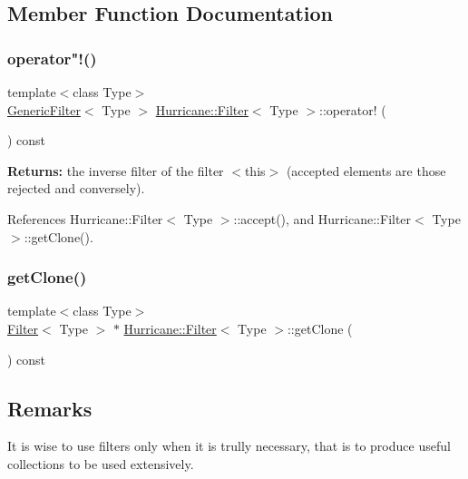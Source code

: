 \subsection{Member Function Documentation}
\mbox{\label{classHurricane_1_1Filter_a90c1a8c4caf6c6018ff50f5b9754e061}} 
\subsubsection{\texorpdfstring{operator"!()}{operator!()}}
{\footnotesize\ttfamily template$<$class Type$>$ \\
\hyperlink{classHurricane_1_1GenericFilter}{Generic\+Filter}$<$ Type $>$ \hyperlink{classHurricane_1_1Filter}{Hurricane\+::\+Filter}$<$ Type $>$\+::operator! (\begin{DoxyParamCaption}{ }\end{DoxyParamCaption}) const\hspace{0.3cm}{\ttfamily [inline]}}

{\bfseries Returns\+:} the inverse filter of the filter {\ttfamily $<$this$>$} (accepted elements are those rejected and conversely). 

References Hurricane\+::\+Filter$<$ Type $>$\+::accept(), and Hurricane\+::\+Filter$<$ Type $>$\+::get\+Clone().

\mbox{\label{classHurricane_1_1Filter_a596cad421801115efbc5c541f8d29e0b}} 
\subsubsection{\texorpdfstring{get\+Clone()}{getClone()}}
{\footnotesize\ttfamily template$<$class Type$>$ \\
\hyperlink{classHurricane_1_1Filter}{Filter}$<$ Type $>$ $\ast$ \hyperlink{classHurricane_1_1Filter}{Hurricane\+::\+Filter}$<$ Type $>$\+::get\+Clone (\begin{DoxyParamCaption}{ }\end{DoxyParamCaption}) const\hspace{0.3cm}{\ttfamily [pure virtual]}}

\hypertarget{classHurricane_1_1Filter_secFilterRemarks}{}\subsection{Remarks}\label{classHurricane_1_1Filter_secFilterRemarks}
It is wise to use filters only when it is trully necessary, that is to produce useful collections to be used extensively.

